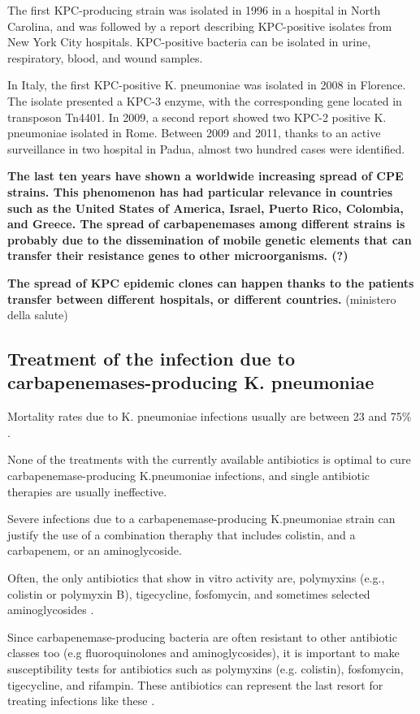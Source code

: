 \documentclass[11pt]{report}
\begin{document}
The first KPC-producing strain was isolated in 1996 in a hospital in North Carolina, and was followed by a report describing KPC-positive isolates from New York City hospitals.
KPC-positive bacteria can be isolated in urine, respiratory, blood, and wound samples. 

In Italy, the first KPC-positive K. pneumoniae was isolated in 2008 in Florence. The isolate presented a KPC-3 enzyme, with the corresponding gene located in transposon Tn4401.
In 2009, a second report showed two KPC-2 positive K. pneumoniae isolated in Rome.
Between 2009 and 2011, thanks to an active surveillance in two hospital in Padua, almost two hundred cases were identified.
\cite{MunozPrice2013}

\textbf{The last ten years have shown a worldwide increasing spread of CPE strains.
This phenomenon has had particular relevance in countries such as the United States of America, Israel, Puerto Rico, Colombia, and Greece.
The spread of carbapenemases among different strains is probably due to the dissemination of mobile genetic elements that can transfer their resistance genes to other microorganisms. (?)}

\textbf{The spread of KPC epidemic clones can happen thanks to the patients transfer between different hospitals, or different countries.}
(ministero della salute)

\subsection{Treatment of the infection due to carbapenemases-producing K. pneumoniae}

Mortality rates due to K. pneumoniae infections usually are between 23 and 75$\%$ \cite{karaiskos2014multidrug}. 

None of the treatments with the currently available antibiotics is optimal to cure carbapenemase-producing K.pneumoniae infections, and single antibiotic therapies are usually ineffective.

Severe infections due to a carbapenemase-producing K.pneumoniae strain can justify the use of a combination theraphy that includes colistin, and a carbapenem, or an aminoglycoside.

Often, the only antibiotics that show in vitro activity are, polymyxins (e.g., colistin or polymyxin B), tigecycline, fosfomycin, and sometimes selected aminoglycosides \cite{rodriguez2015diagnosis}.

Since carbapenemase-producing bacteria are often resistant to other antibiotic classes too (e.g fluoroquinolones and aminoglycosides), it is important to make susceptibility tests for antibiotics such as polymyxins (e.g. colistin), fosfomycin, tigecycline, and rifampin. These antibiotics can represent the last resort for treating infections like these \cite{adams2009activity}.
\end{document}
